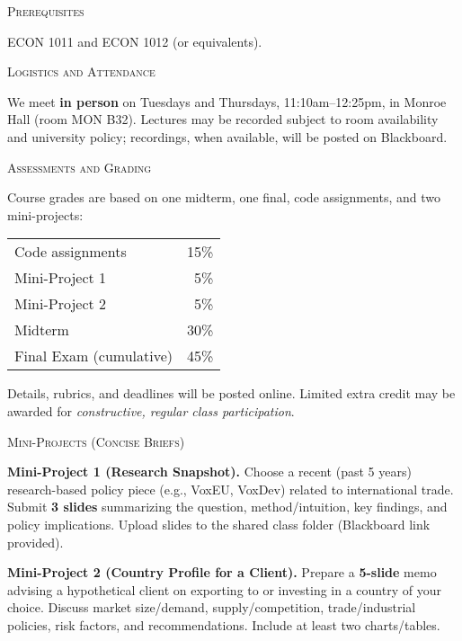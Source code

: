 \documentclass[11pt]{article}
\begin{document}
\bigskip

\noindent\textsc{Prerequisites}
\smallskip

ECON 1011 and ECON 1012 (or equivalents).

\bigskip

\noindent\textsc{Logistics and Attendance}

\smallskip
We meet \textbf{in person} on Tuesdays and Thursdays, 11:10am--12:25pm, in Monroe Hall (room  MON B32). Lectures may be recorded subject to room availability and university policy; recordings, when available, will be posted on Blackboard.

\bigskip

\noindent\textsc{Assessments and Grading}

\smallskip
Course grades are based on one midterm, one final, code assignments, and two mini-projects:

\medskip
\begin{tabular}{l r}
Code assignments & 15\% \\
Mini-Project 1 & 5\% \\
Mini-Project 2 & 5\% \\
Midterm & 30\% \\
Final Exam (cumulative) & 45\%
\end{tabular}

\medskip
\noindent Details, rubrics, and deadlines will be posted online. Limited extra credit may be awarded for \textit{constructive, regular class participation}.

\bigskip

\noindent\textsc{Mini-Projects (Concise Briefs)}

\smallskip
\textbf{Mini-Project 1 (Research Snapshot).} Choose a recent (past 5 years) research-based policy piece (e.g., VoxEU, VoxDev) related to international trade. Submit \textbf{3 slides} summarizing the question, method/intuition, key findings, and policy implications. Upload slides to the shared class folder (Blackboard link provided). 

\smallskip
\textbf{Mini-Project 2 (Country Profile for a Client).} Prepare a \textbf{5-slide} memo advising a hypothetical client on exporting to or investing in a country of your choice. Discuss market size/demand, supply/competition, trade/industrial policies, risk factors, and recommendations. Include at least two charts/tables.
\end{document}
